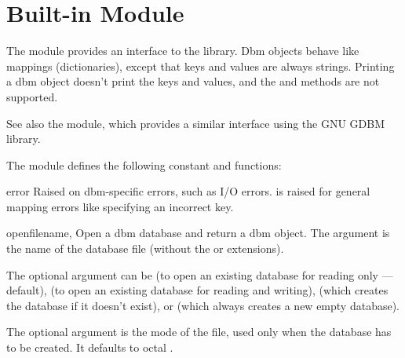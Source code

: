 \section{Built-in Module }



The  module provides an interface to the \UNIX{}
 library.  Dbm objects behave like mappings
(dictionaries), except that keys and values are always strings.
Printing a dbm object doesn't print the keys and values, and the
 and  methods are not supported.

See also the  module, which provides a similar interface
using the GNU GDBM library.

The module defines the following constant and functions:

\begin{excdesc}{error}
Raised on dbm-specific errors, such as I/O errors.  is
raised for general mapping errors like specifying an incorrect key.
\end{excdesc}

\begin{funcdesc}{open}{filename, }
Open a dbm database and return a dbm object.  The 
argument is the name of the database file (without the  or
 extensions).

The optional  argument can be
 (to open an existing database for reading only --- default),
 (to open an existing database for reading and writing),
 (which creates the database if it doesn't exist), or
 (which always creates a new empty database).

The optional  argument is the \UNIX{} mode of the file, used
only when the database has to be created.  It defaults to octal
.
\end{funcdesc}

